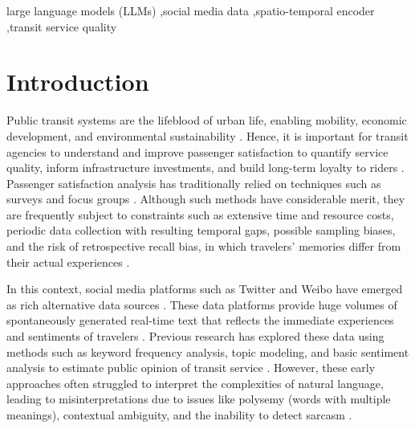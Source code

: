\documentclass[a4paper,fleqn,12pt]{cas-sc}
\begin{document}
\begin{keywords}
large language models (LLMs) \sep social media data \sep spatio-temporal encoder \sep transit service quality
\end{keywords}


\maketitle
\setlength{\parindent}{15pt}
\setlength{\parskip}{0.1in}
\linenumbers

\section{Introduction}\label{sec:introduction}
Public transit systems are the lifeblood of urban life, enabling mobility, economic development, and environmental sustainability \citep{Aguilra2014, zhang2024trafficgpt}. Hence, it is important for transit agencies to understand and improve passenger satisfaction to quantify service quality, inform infrastructure investments, and build long-term loyalty to riders \citep{luo2023influential, susilo2014exploring, de2017travel}. Passenger satisfaction analysis has traditionally relied on techniques such as surveys and focus groups \citep{zeng2024exploring, collins2013novel}. Although such methods have considerable merit, they are frequently subject to constraints such as extensive time and resource costs, periodic data collection with resulting temporal gaps, possible sampling biases, and the risk of retrospective recall bias, in which travelers' memories differ from their actual experiences \citep{luo2023influential, mendez2019using, de2013travel}.

In this context, social media platforms such as Twitter and Weibo have emerged as rich alternative data sources \citep{cheng2025arrival}. These data platforms provide huge volumes of spontaneously generated real-time text that reflects the immediate experiences and sentiments of travelers \citep{collins2013novel, wang2019travel}. Previous research has explored these data using methods such as keyword frequency analysis, topic modeling, and basic sentiment analysis to estimate public opinion of transit service \citep{magnini2011understanding, cheng2011evaluating, collins2013novel}. However, these early approaches often struggled to interpret the complexities of natural language, leading to misinterpretations due to issues like polysemy (words with multiple meanings), contextual ambiguity, and the inability to detect sarcasm \citep{cao2013association, de2017travel, Yan2019}.
\end{document}
